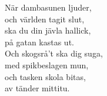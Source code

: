 \vspace{10pt}

När dambasunen ljuder,\\
och världen tagit slut,\\
ska du din jävla hallick,\\
på gatan kastas ut.\\
Och skogsrå't ska dig suga,\\
med spikbeslagen mun,\\
och tasken skola bitas,\\
av tänder mittitu.

